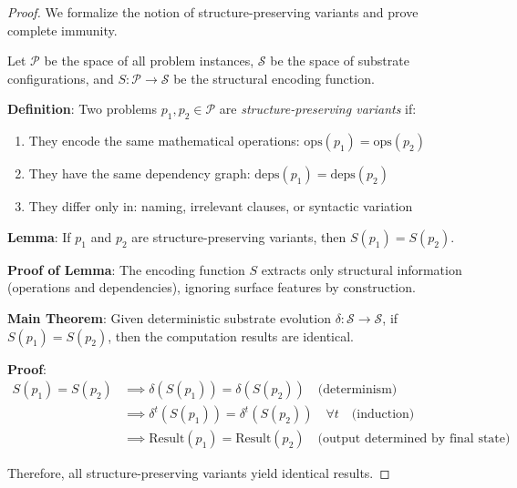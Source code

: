 \documentclass[11pt,letterpaper]{article}
\theoremstyle{plain}
\theoremstyle{definition}
\theoremstyle{remark}
\begin{document}
\begin{proof}
We formalize the notion of structure-preserving variants and prove complete immunity.

Let $\mathcal{P}$ be the space of all problem instances, $\mathcal{S}$ be the space of substrate configurations, and $S: \mathcal{P} \rightarrow \mathcal{S}$ be the structural encoding function.

\textbf{Definition}: Two problems $p_1, p_2 \in \mathcal{P}$ are \emph{structure-preserving variants} if:
\begin{enumerate}
\item They encode the same mathematical operations: $\text{ops}(p_1) = \text{ops}(p_2)$
\item They have the same dependency graph: $\text{deps}(p_1) = \text{deps}(p_2)$
\item They differ only in: naming, irrelevant clauses, or syntactic variation
\end{enumerate}

\textbf{Lemma}: If $p_1$ and $p_2$ are structure-preserving variants, then $S(p_1) = S(p_2)$.

\textbf{Proof of Lemma}: The encoding function $S$ extracts only structural information (operations and dependencies), ignoring surface features by construction.

\textbf{Main Theorem}: Given deterministic substrate evolution $\delta: \mathcal{S} \rightarrow \mathcal{S}$, if $S(p_1) = S(p_2)$, then the computation results are identical.

\textbf{Proof}: 
\begin{align}
S(p_1) = S(p_2) &\implies \delta(S(p_1)) = \delta(S(p_2)) \quad \text{(determinism)}\\
&\implies \delta^t(S(p_1)) = \delta^t(S(p_2)) \quad \forall t \quad \text{(induction)}\\
&\implies \text{Result}(p_1) = \text{Result}(p_2) \quad \text{(output determined by final state)}
\end{align}

Therefore, all structure-preserving variants yield identical results.
\end{proof}
\end{document}
